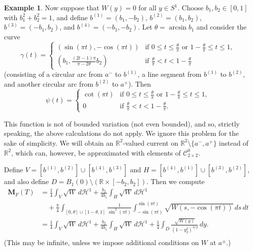 \documentclass[a4paper]{article}
\newcommand{\R}{\mathbb{R}}
\newcommand{\Ha}{\mathcal{H}}
\newcommand{\M}{\mathbf{M}}
\newcommand{\ncrt}{\mathcal{C}}
\theoremstyle{definition}
\newtheorem{example}[theorem]{Example}
\theoremstyle{remark}
\begin{document}
\begin{example} \label{exm:cross-tie}
Now suppose that $W(y) = 0$ for all $y \in S^1$. Choose $b_1, b_2 \in [0, 1]$ with $b_1^2 + b_2^2 = 1$, and define
$b^{(1)} = (b_1, -b_2)$, $b^{(2)} = (b_1, b_2)$, $b^{(3)} = (-b_1, b_2)$,
and $b^{(4)} = (-b_1, -b_2)$. Let $\theta = \arcsin b_1$ and consider the curve
\[
\gamma(t) = \begin{cases}
(\sin(\pi t), -\cos(\pi t)) & \text{if $0 \le t \le \frac{\theta}{\pi}$ or $1 - \frac{\theta}{\pi} \le t \le 1$}, \\
(b_1, \frac{(2t - 1)\pi}{\pi - 2\theta}b_2) & \text{if $\frac{\theta}{\pi} < t < 1 - \frac{\theta}{\pi}$}
\end{cases}
\]
(consisting of a circular arc from $a^-$ to $b^{(1)}$, a line segment from $b^{(1)}$ to $b^{(2)}$,
and another circular arc from $b^{(2)}$ to $a^+$). Then
\[
\psi(t) = \begin{cases}
\cot(\pi t) & \text{if $0 \le t \le \frac{\theta}{\pi}$ or $1 - \frac{\theta}{\pi} \le t \le 1$}, \\
0 & \text{if $\frac{\theta}{\pi} < t < 1 - \frac{\theta}{\pi}$}.
\end{cases}
\]

This function is not of bounded variation (not even bounded), and so, strictly speaking, the above
calculations do not apply. We ignore this problem for the sake of simplicity.
We will obtain an $\R^2$-valued current on $\R^2 \setminus \{a^-, a^+\}$ instead of $\R^2$, which
can, however, be approximated with elements of $\ncrt_{2 \times 2}^0$.

Define $V = [b^{(1)}, b^{(2)}] \cup [b^{(4)}, b^{(3)}]$ and $H = [b^{(4)}, b^{(1)}] \cup [b^{(3)}, b^{(2)}]$,
and also define $D = B_1(0) \setminus (\R \times [-b_2, b_2])$. Then we compute
\[
\begin{split}
\M_F(T) & = \frac{1}{4} \int_V \sqrt{W} \, d\Ha^1 + \frac{b_2}{4b_1} \int_H \sqrt{W} \, d\Ha^1 \\
& \quad + \frac{\pi}{4} \int_{[0, \theta] \cup [1 - \theta, 1]} \frac{1}{\sin^2(\pi t)} \int_{-\sin(\pi t)}^{\sin(\pi t)} \sqrt{W(s, -\cos(\pi t))} \, ds \, dt \\
& = \frac{1}{4} \int_V \sqrt{W} \, d\Ha^1 + \frac{b_2}{4b_1} \int_H \sqrt{W} \, d\Ha^1 + \frac{1}{4} \int_D \frac{\sqrt{W(y)}}{(1 - y_2^2)^{3/2}} \, dy. \\
\end{split}
\]
(This may be infinite, unless we impose additional conditions on $W$ at $a^\pm$.)


\end{example}
\end{document}
